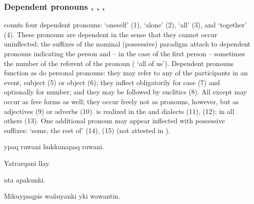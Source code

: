 {\subsubsection{Dependent pronouns , , , }\label{ssec:deppro}
\SYQ{} counts four dependent pronouns:  `oneself' (1),  `alone' (2),  `all' (3), and  `together' (4). These pronouns are dependent in the sense that they cannot occur uninflected: the suffixes of the nominal (possessive) paradigm attach to dependent pronouns indicating the person and -- in the case of the first person -- sometimes the number of the referent of the pronoun ( `all of us'). Dependent pronouns function as do personal pronouns: they may refer to any of the participants in an event, subject (5) or object (6); they inflect obligatorily for case (7) and optionally for number; and they may be followed by enclitics (8). All except  may occur as free forms as well; they occur freely not as pronouns, however, but as adjectives (9) or adverbs (10).  is realized  in the \CH{} and \LT{} dialects (11), (12);  in all others (13). One additional pronoun may appear inflected with possessive suffixes:  `some, the rest of' (14), (15) (not attested in \CH).

%
{ypaq ruwani hukkunapaq ruwani.}%
{}%
{}{}%

%
{Yatrarqani llay.}%
{}%
{}{}%

%
{nta apakunki.}%
{}%
{}{}%

%
{Mikuypaqpis wa\~nuyanki yki wawantin.}%
{}%
{}{}%

}
